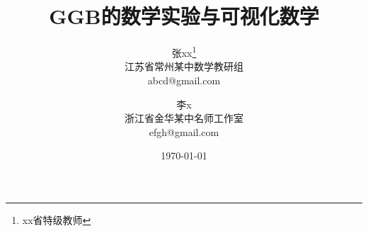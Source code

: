 \documentclass{ctexart}
\begin{document}
\title {\vspace{-8mm}\heiti{}GGB的数学实验与可视化数学 \vspace{5mm}}
\author {张xx\thanks{xx省特级教师}\\[2mm]江苏省常州某中数学教研组\\abcd@gmail.com
\and 李\quad x\\[2mm]浙江省金华某中名师工作室\\efgh@gmail.com}
\date{\today}
\maketitle
\end{document}
